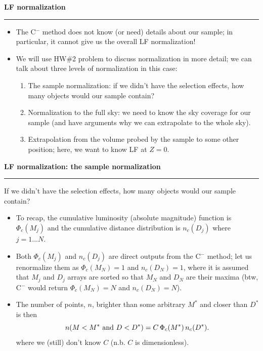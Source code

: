 \documentclass[letterpaper,landscape]{slides}
\begin{document}
\begin{slide}
\begin{center}
\bfseries
{\large {\color{red} LF normalization}}
\end{center}
\vskip 0.2in
\hrule

\begin{itemize}
\item The C$^-$ method does not know (or need) details about our sample; in particular, 
     it cannot give us the overall LF normalization! 
\item We will use HW\#2 problem to discuss normalization in more detail; we can talk 
about three levels of normalization in this case:
\begin{enumerate} 
\item {\color{blue} The sample normalization:} if we didn't have the selection effects, how many 
  objects would our sample contain? 
\item {\color{blue} Normalization to the full sky:} we need to know the sky coverage for our 
   sample (and have arguments why we can extrapolate to the whole sky). 
\item {\color{blue} Extrapolation}  from the volume probed by the sample  {\color{blue} to some other position;} 
   here, we want to know LF at $Z=0$. 
\end{enumerate} 
\end{itemize}

\vfill
\end{slide}
 
\begin{slide}
\begin{center}
\bfseries
{\large {\color{red} LF normalization: the sample normalization}}
\end{center}
\vskip 0.2in
\hrule
{\color{blue} If we didn't have the selection effects, how many 
  objects would our sample contain?} 
\begin{itemize}
\item  To recap, the cumulative luminosity (absolute magnitude) function is 
$\Phi_c(M_j)$ and the cumulative distance distribution is $n_c(D_j)$ where
$j=1...N$.
\item Both $\Phi_c(M_j)$ and $n_c(D_j)$ are  {\color{blue} direct outputs} from the C$^-$ method;
{\color{blue} let us renormalize them} as $\Phi_c(M_N)=1$ and  $n_c(D_N)=1$,
where it is assumed that $M_j$ and $D_j$ arrays are sorted so that $M_N$ and 
$D_N$ are their maxima (btw, C$^-$ would return $\Phi_c(M_N)=N$ and  $n_c(D_N)=N$). 
\item The number of points, $n$,  brighter than some arbitrary $M^\ast$ and closer than $D^\ast$ is then
\begin{equation}
          n(M<M^\ast \,\, {\rm and} \,\,  D<D^\ast)= C \, \Phi_c(M^\ast) \, n_c(D^\ast).
\end{equation}
where we (still) don't know $C$ (n.b. $C$ is dimensionless). 
\end{itemize}

\vfill
\end{slide}
 
\end{document}
